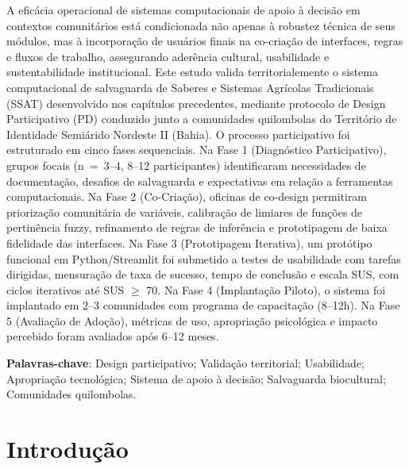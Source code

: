 {\renewcommand{\PRIVATEbookmarkthis}[1]{}%
\begin{resumoumacoluna}
A eficácia operacional de sistemas computacionais de apoio à decisão em contextos comunitários está condicionada não apenas à robustez técnica de seus módulos, mas à incorporação de usuários finais na co-criação de interfaces, regras e fluxos de trabalho, assegurando aderência cultural, usabilidade e sustentabilidade institucional. Este estudo valida territorialemente o sistema computacional de salvaguarda de Saberes e Sistemas Agrícolas Tradicionais (SSAT) desenvolvido nos capítulos precedentes, mediante protocolo de Design Participativo (PD) conduzido junto a comunidades quilombolas do Território de Identidade Semiárido Nordeste II (Bahia). O processo participativo foi estruturado em cinco fases sequenciais. Na Fase 1 (Diagnóstico Participativo), grupos focais (n~=~3--4, 8--12 participantes) identificaram necessidades de documentação, desafios de salvaguarda e expectativas em relação a ferramentas computacionais. Na Fase 2 (Co-Criação), oficinas de co-design permitiram priorização comunitária de variáveis, calibração de limiares de funções de pertinência fuzzy, refinamento de regras de inferência e prototipagem de baixa fidelidade das interfaces. Na Fase 3 (Prototipagem Iterativa), um protótipo funcional em Python/Streamlit foi submetido a testes de usabilidade com tarefas dirigidas, mensuração de taxa de sucesso, tempo de conclusão e escala SUS, com ciclos iterativos até SUS $\geq$ 70. Na Fase 4 (Implantação Piloto), o sistema foi implantado em 2--3 comunidades com programa de capacitação (8--12h). Na Fase 5 (Avaliação de Adoção), métricas de uso, apropriação psicológica e impacto percebido foram avaliados após 6--12 meses.

\vspace{\onelineskip}
\noindent
\textbf{Palavras-chave}: Design participativo; Validação territorial; Usabilidade; Apropriação tecnológica; Sistema de apoio à decisão; Salvaguarda biocultural; Comunidades quilombolas.
\end{resumoumacoluna}}

\newpage

\section{Introdução}

